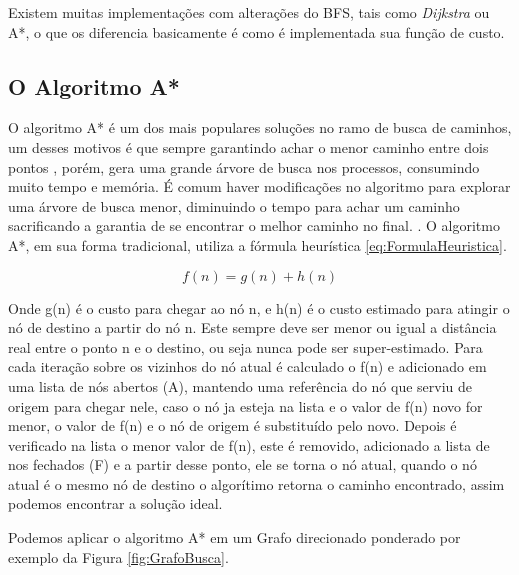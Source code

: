 Existem muitas implementações com alterações do BFS, tais como \textit{Dijkstra} ou A*, o que os diferencia basicamente é como é implementada sua função de custo.

\subsection{O Algoritmo A*}

O algoritmo A* é um dos mais populares soluções no ramo de busca de caminhos, um desses motivos é que sempre garantindo achar o menor caminho entre dois pontos \cite{PEHart}, porém,  gera uma grande árvore de busca nos processos, consumindo muito tempo e memória. É comum haver modificações no algoritmo para explorar uma árvore de busca menor, diminuindo o tempo para achar um caminho sacrificando a garantia de se encontrar o melhor caminho no final. \cite{Botea}.
O algoritmo A*, em sua forma tradicional, utiliza a fórmula heurística \ref{eq:FormulaHeuristica}. 

\begin{equation} \label{eq:FormulaHeuristica}
     f(n) = g(n) + h(n)
\end{equation}

Onde g(n) é o custo para chegar ao nó n, e h(n) é o custo estimado para atingir o nó de destino a partir do nó n. Este sempre deve ser menor ou igual a distância real entre o ponto n e o destino, ou seja nunca pode ser super-estimado. Para cada iteração sobre os vizinhos do nó atual é calculado o f(n) e adicionado em uma lista de nós abertos (A), mantendo uma referência do nó que serviu de origem para chegar nele, caso o nó ja esteja na lista e o valor de f(n) novo for menor, o valor de f(n) e o nó de origem é substituído pelo novo. Depois é verificado na lista o menor valor de f(n), este é removido, adicionado a lista de nos fechados (F) e a partir desse ponto, ele se torna o nó atual, quando o nó atual é o mesmo nó de destino o algorítimo retorna o caminho encontrado, assim podemos encontrar a solução ideal. \cite{PEHart} 

Podemos aplicar o algoritmo A* em um Grafo direcionado ponderado por exemplo da Figura \ref{fig:GrafoBusca}.

